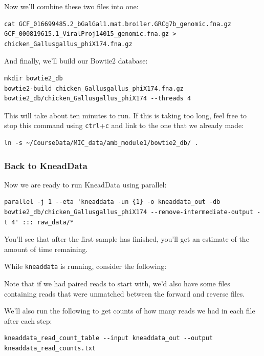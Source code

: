 \documentclass[
]{book}
\begin{document}
Now we'll combine these two files into one:

\begin{verbatim}
cat GCF_016699485.2_bGalGal1.mat.broiler.GRCg7b_genomic.fna.gz GCF_000819615.1_ViralProj14015_genomic.fna.gz > chicken_Gallusgallus_phiX174.fna.gz
\end{verbatim}

And finally, we'll build our Bowtie2 database:

\begin{verbatim}
mkdir bowtie2_db
bowtie2-build chicken_Gallusgallus_phiX174.fna.gz bowtie2_db/chicken_Gallusgallus_phiX174 --threads 4
\end{verbatim}

This will take about ten minutes to run. If this is taking too long, feel free to stop this command using \texttt{ctrl}+\texttt{c} and link to the one that we already made:

\begin{verbatim}
ln -s ~/CourseData/MIC_data/amb_module1/bowtie2_db/ .
\end{verbatim}

\subsubsection{Back to KneadData}\label{back-to-kneaddata}

Now we are ready to run KneadData using parallel:

\begin{verbatim}
parallel -j 1 --eta 'kneaddata -un {1} -o kneaddata_out -db bowtie2_db/chicken_Gallusgallus_phiX174 --remove-intermediate-output -t 4' ::: raw_data/*
\end{verbatim}

You'll see that after the first sample has finished, you'll get an estimate of the amount of time remaining.

While \texttt{kneaddata} is running, consider the following:

Note that if we had paired reads to start with, we'd also have some files containing reads that were unmatched between the forward and reverse files.

We'll also run the following to get counts of how many reads we had in each file after each step:

\begin{verbatim}
kneaddata_read_count_table --input kneaddata_out --output kneaddata_read_counts.txt
\end{verbatim}
\end{document}
